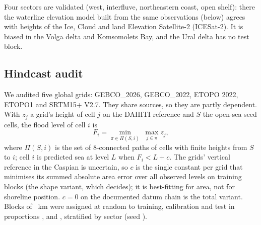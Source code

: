 Four sectors are validated (west, interfluve, northeastern coast, open shelf): there the waterline elevation model built from the same observations (below) agrees with heights of the Ice, Cloud and land Elevation Satellite-2 (ICESat-2). It is biased in the Volga delta and Komsomolets Bay, and the Ural delta has no test block.

\subsection{Hindcast audit}
We audited five global grids: GEBCO\_2026\citep{gebco2026}, GEBCO\_2022\citep{gebco2022}, ETOPO 2022\citep{etopo2022,macferrin2025}, ETOPO1\citep{amante2009} and SRTM15+ V2.7\citep{tozer2019}. They share sources, so they are partly dependent\citep{macferrin2025,gebco2022}. With $z_j$ a grid's height of cell $j$ on the DAHITI reference and $S$ the open-sea seed cells, the flood level of cell $i$ is
\begin{equation}
  F_i = \min_{\pi \in \Pi(S, i)} \; \max_{j \in \pi} z_j ,
  \label{eq:floodlevel}
\end{equation}
where $\Pi(S, i)$ is the set of 8-connected paths of cells with finite heights from $S$ to $i$; cell $i$ is predicted sea at level $L$ when $F_i < L + c$. The grids' vertical reference in the Caspian is uncertain\citep{gebco2026,tozer2019}, so $c$ is the single constant per grid that minimises its summed absolute area error over all observed levels on training blocks (the shape variant, which decides); it is best-fitting for area, not for shoreline position. $c = 0$ on the documented datum chain is the total variant. Blocks of ~km were assigned at random to training, calibration and test in proportions ,  and , stratified by sector (seed ).

